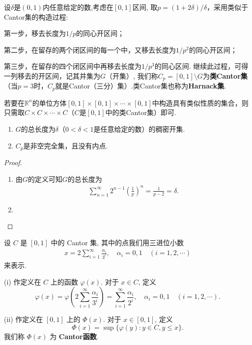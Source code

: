 \documentclass[../../main.tex]{subfiles}
\begin{document}
\begin{definition}[类Cantor集]
设$\delta$是$(0,1)$内任意给定的数,考虑在$[0,1]$区间, 取$p=(1 + 2\delta)/\delta$，采用类似于Cantor集的构造过程:

第一步，移去长度为$1/p$的同心开区间；

第二步，在留存的两个闭区间的每一个中，又移去长度为$1/p^2$的同心开区间；

第三步，在留存的四个闭区间中再移去长度为$1/p^3$的同心区间. 继续此过程，可得一列移去的开区间，记其并集为$G$（开集）,
我们称$C_p=[0,1]\setminus G$为\textbf{类Cantor集}（当$p = 3$时，$C_p$就是Cantor（三分）集）.类Cantor集也称为\textbf{Harnack集}. 
\end{definition}
\begin{remark}
若要在$\mathbb{R}^n$的单位方体$[0,1]\times[0,1]\times\cdots\times[0,1]$中构造具有类似性质的集合，则只需取$C\times C\times\cdots\times C$（$C$是$[0,1]$中的类Cantor集）即可.
\end{remark}

\begin{theorem}[类Cantor集的基本性质]\label{theorem:类Cantor集的基本性质}
\begin{enumerate}[(1)]
\item $G$的总长度为$\delta$（$0<\delta<1$是任意给定的数）的稠密开集.

\item $C_p$是非空完全集，且没有内点.
\end{enumerate}
\end{theorem}
\begin{proof}
\begin{enumerate}[(1)]
\item 由$G$的定义可知$G$的总长度为
\begin{align*}
\sum_{n = 1}^{\infty}2^{n - 1}\left(\frac{1}{p}\right)^n=\frac{1}{p - 2}=\delta.
\end{align*}

\item 
\end{enumerate}
\end{proof}

\begin{definition}[Cantor函数]\label{definition:Cantor函数}
设 \(C\) 是 \([0,1]\) 中的 Cantor 集, 其中的点我们用三进位小数
\begin{align*}
x = 2\sum_{i = 1}^{\infty}\frac{\alpha_i}{3^i}, \quad \alpha_i = 0,1 \quad (i = 1,2,\cdots)
\end{align*}
来表示.

(i) 作定义在 \(C\) 上的函数 \(\varphi(x)\). 对于 \(x \in C\), 定义
\[
\varphi(x)=\varphi\left(2\sum_{i = 1}^{\infty}\frac{\alpha_i}{3^i}\right)=\sum_{i = 1}^{\infty}\frac{\alpha_i}{2^i}, \quad \alpha_i = 0,1 \quad (i = 1,2,\cdots).
\]

(ii) 作定义在 \([0,1]\) 上的 \(\varPhi(x)\). 对于 \(x \in [0,1]\), 定义
\[
\varPhi(x)=\sup\{\varphi(y):y\in C,y\leqslant x\}.
\]
我们称 \(\varPhi(x)\) 为 \textbf{Cantor函数}.
\end{definition}
\end{document}
